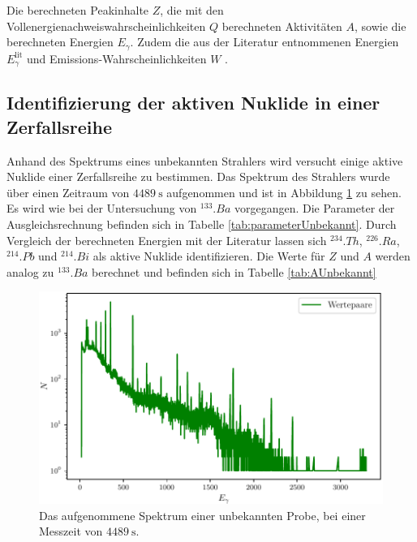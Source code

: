 \begin{table}
	\centering
	\caption{Die berechneten Peakinhalte $Z$, die mit den Vollenergienachweiswahrscheinlichkeiten $Q$ berechneten Aktivitäten $A$,  sowie die berechneten Energien $E_\gamma$.  Zudem die aus der Literatur entnommenen Energien $E_\gamma^\text{lit}$ und Emissions-Wahrscheinlichkeiten $W$ \cite{KHAZOV2011855}.}
	
	\label{tab:ABa}
\end{table}

\subsection{Identifizierung der aktiven Nuklide in einer Zerfallsreihe}

Anhand des Spektrums eines unbekannten Strahlers wird versucht einige aktive Nuklide einer Zerfallsreihe zu bestimmen. Das Spektrum des Strahlers wurde über einen Zeitraum von $\SI{4489}{\second}$ aufgenommen und ist in Abbildung \ref{fig:SpektrumUnbekannt} zu sehen. Es wird wie bei der Untersuchung von $^{133}.{Ba}$ vorgegangen. Die Parameter der Ausgleichsrechnung befinden sich in Tabelle \ref{tab:parameterUnbekannt}. Durch Vergleich der berechneten Energien mit der Literatur \cite{V18} lassen sich $^{234}.{Th}$, $^{226}.{Ra}$, $^{214}.{Pb}$ und $^{214}.{Bi}$ als aktive Nuklide identifizieren. Die Werte für $Z$ und $A$ werden analog zu $^{133}.{Ba}$ berechnet und befinden sich in Tabelle \ref{tab:AUnbekannt}

\begin{figure}
	\centering
	\includegraphics[width=\linewidth-70pt,height=\textheight-70pt,keepaspectratio]{content/images/unbekannt.pdf}
	\caption{Das aufgenommene Spektrum einer unbekannten Probe, bei einer Messzeit von $\SI{4489}{\second}$.}
	\label{fig:SpektrumUnbekannt}
\end{figure}

